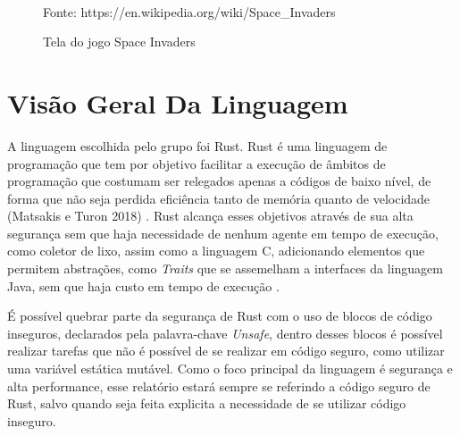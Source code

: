 \documentclass[rel_mlp]{iiufrgs}
\newcommand{\fonte}[1]{\\Fonte: {#1}}
\begin{document}
 \begin{figure}[htb]
     \centering
     \caption{Tela do jogo Space Invaders}
     \label{fig:figuraInv}
     \fonte{https://en.wikipedia.org/wiki/Space_Invaders}%
 \end{figure}
%
\chapter{Visão Geral Da Linguagem}

    
A linguagem escolhida pelo grupo foi Rust. Rust é uma linguagem de programação que tem por objetivo facilitar a execução de âmbitos de programação que costumam ser relegados apenas a códigos de baixo nível, de forma que não seja perdida eficiência tanto de memória quanto de velocidade (Matsakis e Turon 2018) \citet{thebook}. Rust alcança esses objetivos através de sua alta segurança sem que haja necessidade de nenhum agente em tempo de execução, como coletor de lixo, assim como a linguagem C, adicionando  elementos que permitem abstrações, como \textit{Traits} que se assemelham a interfaces da linguagem Java, sem que haja custo em tempo de execução \citet{Traits}.

É possível quebrar parte da segurança de Rust com o uso de blocos de código inseguros, declarados pela palavra-chave \textit{Unsafe}, dentro desses blocos é possível realizar tarefas que não é possível de se realizar em código seguro, como utilizar uma variável estática mutável. Como o foco principal da linguagem é segurança e alta performance, esse relatório estará sempre se referindo a código seguro de Rust, salvo quando seja feita explicita a necessidade de se utilizar código inseguro.
\end{document}
